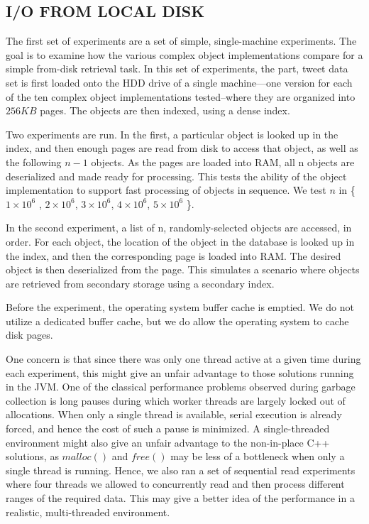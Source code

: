 \subsection{I/O FROM LOCAL DISK}
The first set of experiments are a set of simple, single-machine experiments. The goal is to examine how the various complex object implementations compare for a simple from-disk retrieval task. In this set of experiments, the part, tweet data set is first loaded onto the HDD drive of a single machine—one version for each of the ten complex object implementations tested–where they are organized into $256KB$ pages. The objects are then indexed, using a dense index.

Two experiments are run. In the first, a particular object is looked up in the index, and then enough pages are read from disk to access that object, as well as the following $n − 1$ objects. As the pages are loaded into RAM, all n objects are deserialized and made ready for processing. This tests the ability of the object implementation to support fast processing of objects in sequence. We test $n$ in \{  $1\times 10^6$ , $2\times10^6$, $3\times10^6$, $4\times10^6$, $5\times10^6$ \}.

In the second experiment, a list of n, randomly-selected objects are accessed, in order. For each object, the location of the object in the database is looked up in the index, and then the corresponding page is loaded into RAM. The desired object is then deserialized from the page. This simulates a scenario where objects are retrieved from secondary storage using a secondary index.

Before the experiment, the operating system buffer cache is emptied. We do not utilize a dedicated buffer cache, but we do allow the operating system to cache disk pages.

One concern is that since there was only one thread active at a given time during each experiment, this might give an unfair advantage to those solutions running in the JVM. One of the classical performance problems observed during garbage collection is long pauses during which worker threads are largely locked out of allocations. When only a single thread is available, serial execution is already forced, and hence the cost
of such a pause is minimized. A single-threaded environment might also give an unfair advantage to the non-in-place C++ solutions, as $malloc()$ and $free()$ may be less of a bottleneck when only a single thread is running. Hence, we also ran a set of sequential read experiments where four threads
we allowed to concurrently read and then process different ranges of the required data. This may give a better idea of the performance in a realistic, multi-threaded environment.

